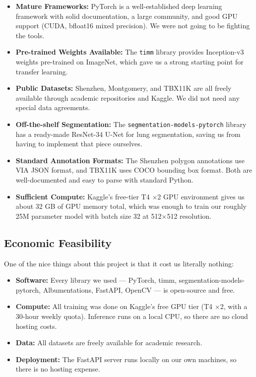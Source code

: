 \documentclass[12pt]{report}
\begin{document}
\begin{itemize}
    \item \textbf{Mature Frameworks:} PyTorch is a well-established deep learning framework with solid documentation, a large community, and good GPU support (CUDA, bfloat16 mixed precision). We were not going to be fighting the tools.

    \item \textbf{Pre-trained Weights Available:} The \texttt{timm} library provides Inception-v3 weights pre-trained on ImageNet, which gave us a strong starting point for transfer learning.

    \item \textbf{Public Datasets:} Shenzhen, Montgomery, and TBX11K are all freely available through academic repositories and Kaggle. We did not need any special data agreements.

    \item \textbf{Off-the-shelf Segmentation:} The \texttt{segmentation-models-pytorch} library has a ready-made ResNet-34 U-Net for lung segmentation, saving us from having to implement that piece ourselves.

    \item \textbf{Standard Annotation Formats:} The Shenzhen polygon annotations use VIA JSON format, and TBX11K uses COCO bounding box format. Both are well-documented and easy to parse with standard Python.

    \item \textbf{Sufficient Compute:} Kaggle's free-tier T4 $\times$2 GPU environment gives us about 32 GB of GPU memory total, which was enough to train our roughly 25M parameter model with batch size 32 at 512$\times$512 resolution.
\end{itemize}

\subsection{Economic Feasibility}
One of the nice things about this project is that it cost us literally nothing:

\begin{itemize}
    \item \textbf{Software:} Every library we used --- PyTorch, timm, segmentation-models-pytorch, Albumentations, FastAPI, OpenCV --- is open-source and free.
    \item \textbf{Compute:} All training was done on Kaggle's free GPU tier (T4 $\times$2, with a 30-hour weekly quota). Inference runs on a local CPU, so there are no cloud hosting costs.
    \item \textbf{Data:} All datasets are freely available for academic research.
    \item \textbf{Deployment:} The FastAPI server runs locally on our own machines, so there is no hosting expense.
\end{itemize}
\end{document}
